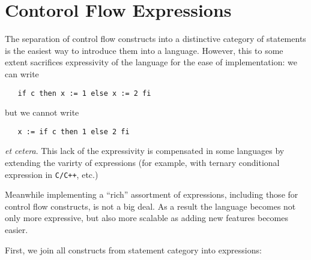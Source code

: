 \documentclass{article}
\author{Dmitry Boulytchev}
\theoremstyle{definition}
\begin{document}
\section{Contorol Flow Expressions}

The separation of control flow constructs into a distinctive category of statements is the easiest way to introduce them into a language.
However, this to some extent sacrifices expressivity of the language for the ease of implementation: we can write

\begin{lstlisting}
   if c then x := 1 else x := 2 fi
\end{lstlisting}

but we cannot write

\begin{lstlisting}
   x := if c then 1 else 2 fi 
\end{lstlisting}

\emph{et cetera}. This lack of the expressivity is compensated in some languages by extending the varirty of expressions (for example,
with ternary conditional expression in \texttt{C/C++}, etc.)

Meanwhile implementing a ``rich'' assortment of expressions, including those for control flow constructs, is not a big deal. As a result
the language becomes not only more expressive, but also more scalable as adding new features becomes easier.

First, we join all constructs from statement category into expressions:
\end{document}
